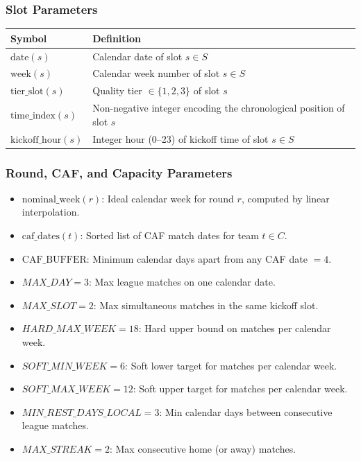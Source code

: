 \documentclass[a4paper,11pt]{article}
\begin{document}
\subsubsection{Slot Parameters}
\begin{table}[h!]
\centering
\begin{tabularx}{\textwidth}{l X}
\toprule
\textbf{Symbol} & \textbf{Definition} \\
\midrule
$\text{date}(s)$ & Calendar date of slot $s \in S$ \\
$\text{week}(s)$ & Calendar week number of slot $s \in S$ \\
$\text{tier\_slot}(s)$ & Quality tier $\in \{1,2,3\}$ of slot $s$ \\
$\text{time\_index}(s)$ & Non-negative integer encoding the chronological position of slot $s$ \\
$\text{kickoff\_hour}(s)$ & Integer hour (0--23) of kickoff time of slot $s \in S$ \\
\bottomrule
\end{tabularx}
\end{table}

\subsubsection{Round, CAF, and Capacity Parameters}
\begin{itemize}
    \item $\text{nominal\_week}(r)$: Ideal calendar week for round $r$, computed by linear interpolation.
    \item $\text{caf\_dates}(t)$: Sorted list of CAF match dates for team $t \in C$.
    \item $\text{CAF\_BUFFER}$: Minimum calendar days apart from any CAF date $= 4$.
    \item $MAX\_DAY = 3$: Max league matches on one calendar date.
    \item $MAX\_SLOT = 2$: Max simultaneous matches in the same kickoff slot.
    \item $HARD\_MAX\_WEEK = 18$: Hard upper bound on matches per calendar week.
    \item $SOFT\_MIN\_WEEK = 6$: Soft lower target for matches per calendar week.
    \item $SOFT\_MAX\_WEEK = 12$: Soft upper target for matches per calendar week.
    \item $MIN\_REST\_DAYS\_LOCAL = 3$: Min calendar days between consecutive league matches.
    \item $MAX\_STREAK = 2$: Max consecutive home (or away) matches.
\end{itemize}
\end{document}
